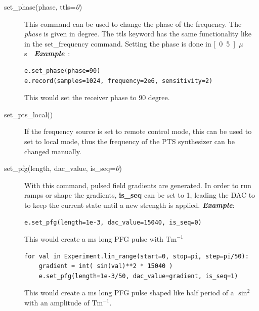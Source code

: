 \documentclass[12pt, a4paper, BCOR10mm, twoside, titlepage, headinclude]{scrbook}
\begin{document}
\begin{description}
\item[set\_phase(phase, ttls=\textit{0})]
This command can be used to change the phase of the frequency. The \textit{phase} is given in degree. The \textsf{ttls} keyword has the same functionality like in the set\_frequency command. Setting the phase is done  in \unit[0.5]{$\mu$s}
\newline
\emph{\textbf{Example}}:
\begin{lstlisting}
e.set_phase(phase=90)
e.record(samples=1024, frequency=2e6, sensitivity=2)
\end{lstlisting}
This would set the receiver phase to 90 degree.
\item[set\_pts\_local()]
If the frequency source is set to remote control mode, this can be used to set to local mode, thus the frequency of the PTS synthesizer can be changed manually.
\item[set\_pfg(length, dac\_value, is\_seq=\textit{0})]
With this command, pulsed field gradients are generated. In order to run ramps or shape the gradients, \textbf{is\_seq} can be set to 1, leading the DAC to to keep the current state until a new strength is applied.
\newline
\emph{\textbf{Example}}:
\begin{lstlisting}
e.set_pfg(length=1e-3, dac_value=15040, is_seq=0)
\end{lstlisting}
This would create a \unit[1]{ms} long PFG pulse with \unit[1]{$\textrm{Tm}^{-1}$}
\begin{lstlisting}
for val in Experiment.lin_range(start=0, stop=pi, step=pi/50):
	gradient = int( sin(val)**2 * 15040 )
	e.set_pfg(length=1e-3/50, dac_value=gradient, is_seq=1)
\end{lstlisting}
This would create a \unit[1]{ms} long PFG pulse shaped like half period of a $\sin^2$ with an amplitude of \unit[1]{$\textrm{Tm}^{-1}$}.



\end{description}
\end{document}
